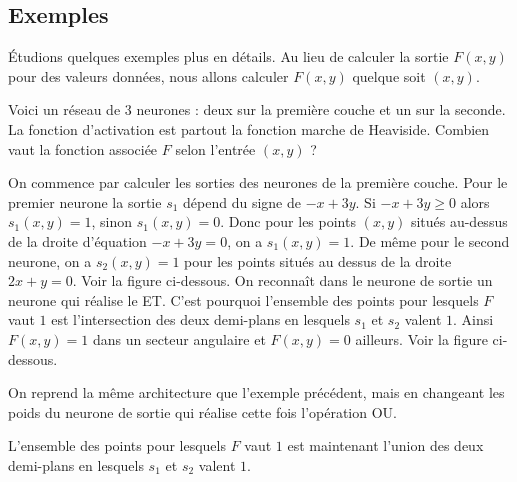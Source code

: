 \subsection{Exemples}


\'Etudions quelques exemples plus en détails. Au lieu de calculer la sortie $F(x,y)$ pour des valeurs données, nous allons calculer $F(x,y)$ quelque soit $(x,y)$.

\vspace*{-1ex}

\begin{exemple}{}{}
	Voici un réseau de $3$ neurones : deux sur la première couche et un sur la seconde. La fonction d'activation est partout la fonction marche de Heaviside.
	Combien vaut la fonction associée $F$ selon l'entrée $(x,y)$ ?
	
	
	
	On commence par calculer les sorties des neurones de la première couche.
	Pour le premier neurone la sortie $s_1$ dépend du signe de $-x+3y$.
	Si $-x+3y \ge 0$ alors $s_1(x,y)=1$, sinon $s_1(x,y)=0$. Donc pour les points $(x,y)$ situés au-dessus de la droite d'équation $-x+3y=0$, on a $s_1(x,y)=1$.
	De même pour le second neurone, on a $s_2(x,y)=1$ pour les points situés au dessus de la droite $2x+y=0$. Voir la figure ci-dessous.
	On reconnaît dans le neurone de sortie un neurone qui réalise le \og{}ET\fg{}. 
	C'est pourquoi l'ensemble des points pour lesquels $F$ vaut $1$ est l'intersection des deux demi-plans en lesquels $s_1$ et $s_2$ valent $1$. Ainsi $F(x,y)=1$ dans un secteur angulaire et $F(x,y)=0$ ailleurs. Voir la figure ci-dessous.
	
	
\end{exemple}

\medskip

\begin{exemple}{}{}
	On reprend la même architecture que l'exemple précédent, mais en changeant les poids du neurone de sortie qui réalise cette fois l'opération \og{}OU\fg{}.
	
	
	L'ensemble des points pour lesquels $F$ vaut $1$ est maintenant l'union des deux demi-plans en lesquels $s_1$ et $s_2$ valent $1$.
	
\end{exemple}

